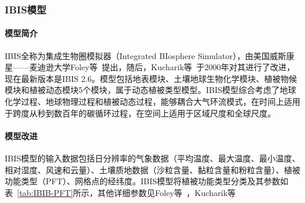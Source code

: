 \subsubsection{IBIS模型}
\paragraph{模型简介} IBIS全称为集成生物圈模拟器（Integrated BIosphere Simulator），由美国威斯康星——麦迪逊大学Foley等~\cite{foley1996integrated}提出，随后，Kucharik等~\cite{kucharik2000testing}于2000年对其进行了改进，现在最新版本是IBIS 2.6。模型包括地表模块、土壤地球生物化学模块、植被物候模块和植被动态模块5个模块，属于动态植被类型模型。IBIS模型综合考虑了地球化学过程、地球物理过程和植被动态过程，能够耦合大气环流模式，在时间上适用于跨度从秒到数百年的碳循环过程，在空间上适用于区域尺度和全球尺度。

\paragraph{模型改进} IBIS模型的输入数据包括日分辨率的气象数据（平均温度、最大温度、最小温度、相对湿度、风速和云量）、土壤质地数据（沙粒含量、黏粒含量和粉粒含量）、植被功能类型（PFT）、网格点的经纬度。IBIS模型将植被功能类型分类及其参数如表~\ref{tab:IBIB-PFT}所示，其他详细参数见Foley等~\cite{foley1996integrated}，Kucharik等~\cite{kucharik2000testing}

